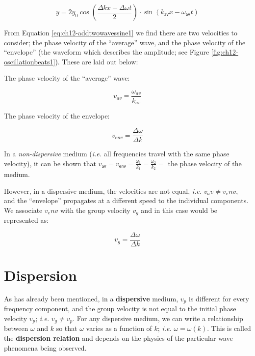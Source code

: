 \documentclass[
]{book}
\begin{document}
\begin{equation}
y= 2 y_{0} \cos \left (\frac{\Delta kx - \Delta\omega t}{2}\right) \cdot \sin(k_\textsf{av}x - \omega_\textsf{av}t )
\label{eq:ch12-addtwowavessine1}
\end{equation}

From Equation \eqref{eq:ch12-addtwowavessine1} we find there are two velocities to consider; the phase velocity of the ``average'' wave, and the phase velocity of the ``envelope'' (the waveform which describes the amplitude; see Figure \ref{fig:ch12-oscillationbeats1}). These are laid out below:

The phase velocity of the ``average'' wave:

\begin{equation}
v_{av} = \frac{\omega_{av}}{k_{av}}
\end{equation}

The phase velocity of the envelope:

\begin{equation}
v_{env} = \frac{\Delta\omega}{\Delta k}
\end{equation}

In a \emph{non-dispersive} medium (\emph{i.e.} all frequencies travel with the same phase velocity), it can be shown that \(v_{\textsf{av}} = v_{\textsf{env}} = \frac{\omega_1}{k_1} = \frac{\omega_2}{k_2} =\) the phase velocity of the medium.

However, in a dispersive medium, the velocities are not equal, \emph{i.e.} \(v_av \neq v_env\), and the ``envelope'' propagates at a different speed to the individual components. We associate \(v_env\) with the group velocity \(v_g\) and in this case would be represented as:

\begin{equation}
v_{g} = \frac{\Delta\omega}{\Delta k}
\end{equation}

\hypertarget{sec:ch12-dispersion}{%
\section{Dispersion}\label{sec:ch12-dispersion}}

As has already been mentioned, in a \textbf{dispersive} medium, \(v_p\) is different for every frequency component, and the group velocity is not equal to the initial phase velocity \(v_p\); \emph{i.e.} \(v_g \neq v_p\). For any dispersive medium, we can write a relationship between \(\omega\) and \(k\) so that \(\omega\) varies as a function of \(k\); \emph{i.e.} \(\omega = \omega(k)\). This is called the \textbf{dispersion relation} and depends on the physics of the particular wave phenomena being observed.
\end{document}
